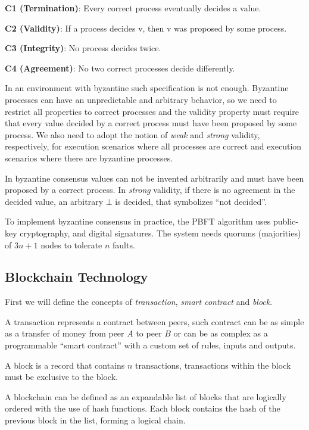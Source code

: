 \documentclass[10pt,journal,compsoc]{IEEEtran}
\begin{document}
	\begin{description}
		\item \textbf{C1 (Termination)}: Every correct process eventually decides a value.
		\item \textbf{C2 (Validity)}: If a process decides v, then v was proposed by some process.
		\item \textbf{C3 (Integrity)}: No process decides twice.
		\item \textbf{C4 (Agreement)}: No two correct processes decide differently.
	\end{description}

	In an environment with byzantine such specification is not enough. Byzantine processes can have an unpredictable and arbitrary behavior, so we need to restrict all properties to correct processes and the validity property must require that every value decided by a correct process must have been proposed by some process.
	We also need to adopt the notion of \textit{weak} and \textit{strong} validity, respectively, for execution scenarios where all processes are correct and execution scenarios where there are byzantine processes. 
	
	In byzantine consensus values can not be invented arbitrarily and must have been proposed by a correct process. In  \textit{strong} validity, if there is no agreement in the decided value, an arbitrary $\bot$ is decided, that symbolizes “not decided”.

	To implement byzantine consensus in practice, the PBFT\cite{castro1999practical} algorithm uses public-key cryptography, and digital signatures. The system needs quorums (majorities) of $3n+1$ nodes to tolerate $n$ faults. 

	\subsection{Blockchain Technology}
	First we will define the concepts of \textit{transaction}, \textit{smart contract} and \textit{block}.
	
	A transaction represents a contract between peers, such contract can be as simple as a transfer of money from peer $A$ to peer $B$ or can be as complex as a programmable “smart contract” with a custom set of rules, inputs and outputs.
	
	A block is a record that contains $n$ transactions, transactions within the block must be exclusive to the block. 

	A blockchain can be defined as an expandable list of blocks that are logically ordered with the use of hash functions. Each block contains the hash of the previous block in the list, forming a logical chain.
\end{document}

